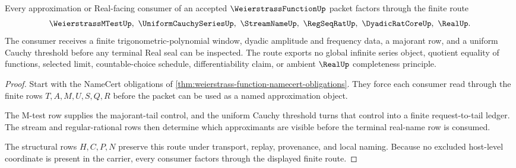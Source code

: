 \begin{theorem}
\label{thm:weierstrass-function-uniform-cauchy-route}
Every approximation or Real-facing consumer of an accepted $\WeierstrassFunctionUp$ packet factors through the finite route
$$
\WeierstrassMTestUp,\ \UniformCauchySeriesUp,\ \StreamNameUp,\ \RegSeqRatUp,\ \DyadicRatCoreUp,\ \RealUp .
$$
The consumer receives a finite trigonometric-polynomial window, dyadic amplitude and frequency data, a majorant row, and a uniform Cauchy threshold before any terminal Real seal can be inspected. The route exports no global infinite series object, quotient equality of functions, selected limit, countable-choice schedule, differentiability claim, or ambient $\RealUp$ completeness principle.
\end{theorem}
\begin{proof}
Start with the NameCert obligations of \autoref{thm:weierstrass-function-namecert-obligations}. They force each consumer read through the finite rows $T,A,M,U,S,Q,R$ before the packet can be used as a named approximation object.

The M-test row supplies the majorant-tail control, and the uniform Cauchy threshold turns that control into a finite request-to-tail ledger. The stream and regular-rational rows then determine which approximants are visible before the terminal real-name row is consumed.

The structural rows $H,C,P,N$ preserve this route under transport, replay, provenance, and local naming. Because no excluded host-level coordinate is present in the carrier, every consumer factors through the displayed finite route.
\end{proof}

